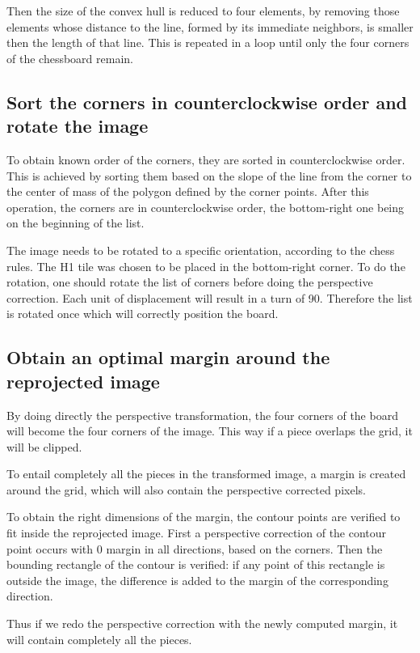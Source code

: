 \documentclass[conference]{IEEEtran}
\begin{document}
Then the size of the convex hull is reduced to four elements, by removing those elements whose distance to the line, formed by its immediate neighbors, is smaller then the length of that line. This is repeated in a loop until only the four corners of the chessboard remain.


\subsection{Sort the corners in counterclockwise order and rotate the image}

To obtain  known order of the corners, they are sorted in counterclockwise order. This is achieved by sorting them based on the slope of the line from the corner to the center of mass of the polygon defined by the corner points. After this operation, the corners are in counterclockwise  order, the bottom-right one being on the beginning of the list. 

The image needs to be rotated to a specific orientation, according to the chess rules. The H1 tile was chosen to be placed in the bottom-right corner. To do the rotation, one should rotate the list of corners before doing the perspective correction. Each unit of displacement will result in a turn of 90\textdegree. Therefore the list is rotated once which will correctly position the board.

\subsection{Obtain an optimal margin around the reprojected image}

By doing directly the perspective transformation, the four corners of the board will become the four corners of the image. This way if a piece overlaps the grid, it will be clipped. 

To entail completely all the pieces in the transformed image, a margin is created around the grid, which will also contain the perspective corrected pixels.

To obtain the right dimensions of the margin, the contour points are verified to fit inside the reprojected image. First a perspective correction of the contour point occurs with 0 margin in all directions, based on the corners. Then the bounding rectangle of the contour is verified: if any point of this rectangle is outside the image, the difference is added to the margin of the corresponding direction.

Thus if we redo the perspective correction with the newly computed margin, it will contain completely all the pieces.
\end{document}
